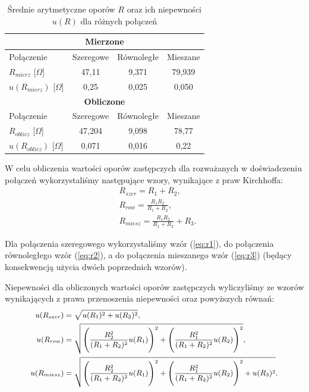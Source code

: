 \documentclass[12pt,a4paper]{article}
\numberwithin{equation}{section}
\begin{document}
\begin{table}[!ht]
	\caption{Średnie arytmetyczne oporów $R$ oraz ich niepewności $u(R)$ dla różnych połączeń}
	\begin{center}
		\begin{tabular}{l||c|c|c}
			\multicolumn{4}{c}{\bfseries Mierzone} \\ \hline
			Połączenie & Szeregowe &  Równoległe & Mieszane \\ \hline
			$R_{mierz}$ [$\Omega$] & 47,11 & 9,371 & 79,939 \\
			$u(R_{mierz})$ [$\Omega$] & 0,25 & 0,025 & 0,050 \\ \hline
			\multicolumn{4}{c}{\bfseries Obliczone} \\ \hline
			Połączenie & Szeregowe &  Równoległe & Mieszane \\ \hline
			$R_{oblicz}$ [$\Omega$] & 47,204 & 9,098 & 78,77 \\
			$u(R_{oblicz})$ [$\Omega$] & 0,071 & 0,016 & 0,22 \\ \hline
		\end{tabular}
	\end{center}
	\label{tab:tab4}
\end{table}

W celu obliczenia wartości oporów zastępczych dla rozważanych w doświadczeniu połączeń wykorzystaliśmy następujące wzory, wynikające z praw Kirchhoffa:
\begin{align}
	& R_{szer} = R_1 + R_2, \label{eq:r1} \\
	& R_{row} = \frac{R_1 R_2}{R_1 + R_2}, \label{eq:r2} \\
	& R_{miesz} = \frac{R_1 R_2}{R_1 + R_2} + R_3. \label{eq:r3}
\end{align}


Dla połączenia szeregowego wykorzystaliśmy wzór (\ref{eq:r1}), do połączenia równoległego wzór (\ref{eq:r2}), a do połączenia mieszanego wzór (\ref{eq:r3}) (będący konsekwencją użycia dwóch poprzednich wzorów).


Niepewności dla obliczonych wartości oporów zastępczych wyliczyliśmy ze wzorów wynikających z prawa przenoszenia niepewności oraz powyższych równań:
\begin{equation}
\small
\begin{split}
u(R_{szer}) &= \sqrt{u(R_1)^2 + u(R_2)^2}, \\
u(R_{row}) &= \sqrt{\Bigg(\frac{R_2^2}{(R_1 + R_2)^2} u(R_1)\Bigg)^2 + \Bigg(\frac{R_1^2}{(R_1 + R_2)^2} u(R_2)\Bigg)^2}, \\
u(R_{miesz}) &= \sqrt{\Bigg(\frac{R_2^2}{(R_1 + R_2)^2} u(R_1)\Bigg)^2 + \Bigg(\frac{R_1^2}{(R_1 + R_2)^2} u(R_2)\Bigg)^2 + u(R_3)^2}.
\end{split}
\end{equation}
\end{document}
